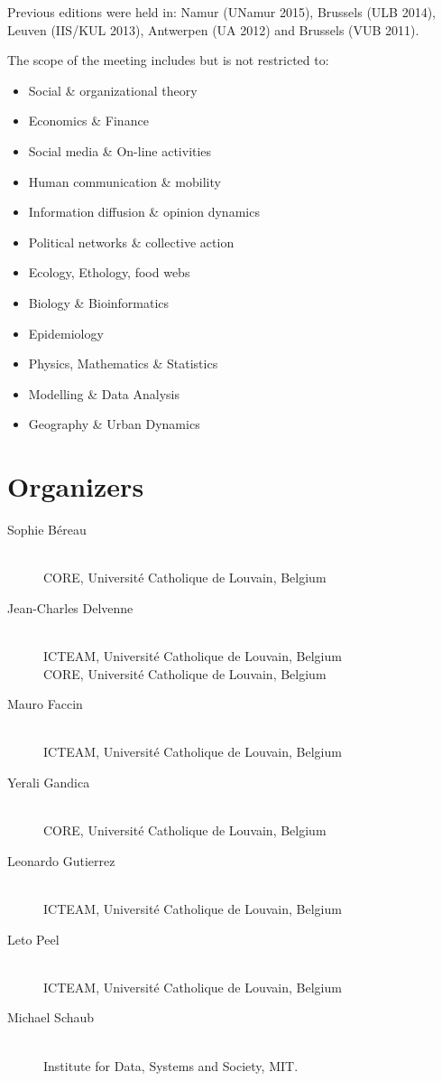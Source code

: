 \documentclass[12pt, a4paper]{scrbook}
\begin{document}
Previous editions were held in:
Namur (UNamur 2015),
Brussels (ULB 2014),
Leuven (IIS/KUL 2013),
Antwerpen (UA 2012) and
Brussels (VUB 2011).

The scope of the meeting includes but is not restricted to:

\begin{itemize}
  \item  Social \& organizational theory
  \item  Economics \& Finance
  \item  Social media \& On-line activities
  \item  Human communication \& mobility
  \item  Information diffusion \& opinion dynamics
  \item  Political networks \& collective action
  \item  Ecology, Ethology, food webs
  \item  Biology \& Bioinformatics
  \item  Epidemiology
  \item  Physics, Mathematics \& Statistics
  \item  Modelling \& Data Analysis
  \item  Geography \& Urban Dynamics
\end{itemize}

\begin{center}
  
\end{center}

\section*{Organizers}

\newcommand{\icteam}{ICTEAM, Université Catholique de Louvain, Belgium}
\newcommand{\core}{CORE, Université Catholique de Louvain, Belgium}
\begin{description}
  \item[Sophie Béreau]\ \\
    \core%
  \item[Jean-Charles Delvenne]\ \\
    \icteam\\
    \core%
  \item[Mauro Faccin]\ \\
    \icteam%
  \item[Yerali Gandica]\ \\
    \core%
  \item[Leonardo Gutierrez]\ \\
    \icteam%
  \item[Leto Peel]\ \\
    \icteam%
  \item[Michael Schaub]\ \\
    Institute for Data, Systems and Society, MIT.
\end{description}
\end{document}
